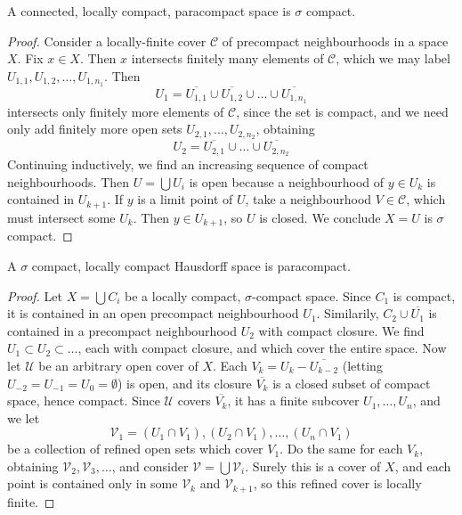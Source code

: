 \begin{lemma}[$4) \to (1$]
    A connected, locally compact, paracompact space is $\sigma$ compact.
\end{lemma}
\begin{proof}
    Consider a locally-finite cover $\mathcal{C}$ of precompact neighbourhoods in a space $X$. Fix $x \in X$. Then $x$ intersects finitely many elements of $\mathcal{C}$, which we may label $U_{1,1}, U_{1,2}, \dots, U_{1,n_1}$. Then
    \[ U_1 = \overline{U_{1,1}} \cup \overline{U_{1,2}} \cup \dots \cup \overline{U_{{1,n_1}}} \]
    intersects only finitely more elements of $\mathcal{C}$, since the set is compact, and we need only add finitely more open sets $U_{2,1}, \dots, U_{2,n_2}$, obtaining
    \[ U_2 = \overline{U_{2,1}} \cup \dots \cup \overline{U_{2,n_2}} \]
    Continuing inductively, we find an increasing sequence of compact neighbourhoods. Then $U = \bigcup U_i$ is open because a neighbourhood of $y \in U_k$ is contained in $U_{k+1}$. If $y$ is a limit point of $U$, take a neighbourhood $V \in \mathcal{C}$, which must intersect some $U_k$. Then $y \in U_{k+1}$, so $U$ is closed. We conclude $X = U$ is $\sigma$ compact.
\end{proof}

\begin{lemma}[$1) \to (4$]
    A $\sigma$ compact, locally compact Hausdorff space is paracompact.
\end{lemma}
\begin{proof}
    Let $X = \bigcup C_i$ be a locally compact, $\sigma$-compact space. Since $C_1$ is compact, it is contained in an open precompact neighbourhood $U_1$. Similarily, $C_2 \cup \overline{U_1}$ is contained in a precompact neighbourhood $U_2$ with compact closure. We find $U_1 \subset U_2 \subset \dots$, each with compact closure, and which cover the entire space. Now let $\mathcal{U}$ be an arbitrary open cover of $X$. Each $V_k = U_{k} - \overline{U_{k-2}}$ (letting $U_{-2} = U_{-1} = U_0 = \emptyset$) is open, and its closure $\overline{V_k}$ is a closed subset of compact space, hence compact. Since $\mathcal{U}$ covers $\overline{V_k}$, it has a finite subcover $U_1, \dots, U_n$, and we let
    \[ \mathcal{V}_1 = (U_1 \cap V_1), (U_2 \cap V_1), \dots, (U_n \cap V_1) \]
    be a collection of refined open sets which cover $V_1$. Do the same for each $V_k$, obtaining $\mathcal{V}_2, \mathcal{V}_3, \dots$, and consider $\mathcal{V} = \bigcup \mathcal{V}_i$. Surely this is a cover of $X$, and each point is contained only in some $\mathcal{V}_k$ and $\mathcal{V}_{k+1}$, so this refined cover is locally finite.
\end{proof}








